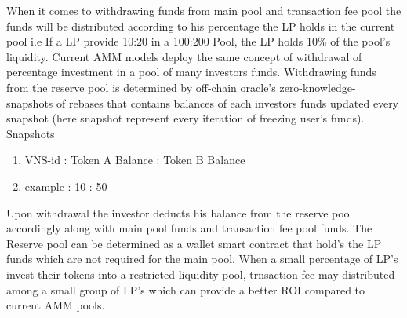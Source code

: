 \documentclass[conference]{IEEEtran}
\begin{document}
When it comes to withdrawing funds from main pool and transaction fee pool the funds will be distributed according to his percentage the LP holds in the current pool i.e If a LP provide 10:20 in a 100:200 Pool, the LP holds 10\% of the pool's liquidity. Current AMM models deploy the same concept of withdrawal of percentage investment in a pool of many investors funds. Withdrawing funds from the reserve pool is determined by off-chain oracle's zero-knowledge-snapshots of rebases that contains balances of each investors funds updated every snapshot (here snapshot represent every iteration of freezing user's funds). \\

Snapshots
\begin{enumerate}[wide, labelwidth=!, labelindent=0pt]
\item VNS-id : Token A Balance : Token B Balance
\item example : 10 : 50
\end{enumerate}

Upon withdrawal the investor deducts his balance from the reserve pool accordingly along with main pool funds and transaction fee pool funds. The Reserve pool can be determined as a wallet smart contract that hold's the LP funds which are not required for the main pool. When a small percentage of LP's invest their tokens into a restricted liquidity pool, trnsaction fee may distributed among a small group of LP's which can provide a better ROI compared to current AMM pools.
\end{document}

